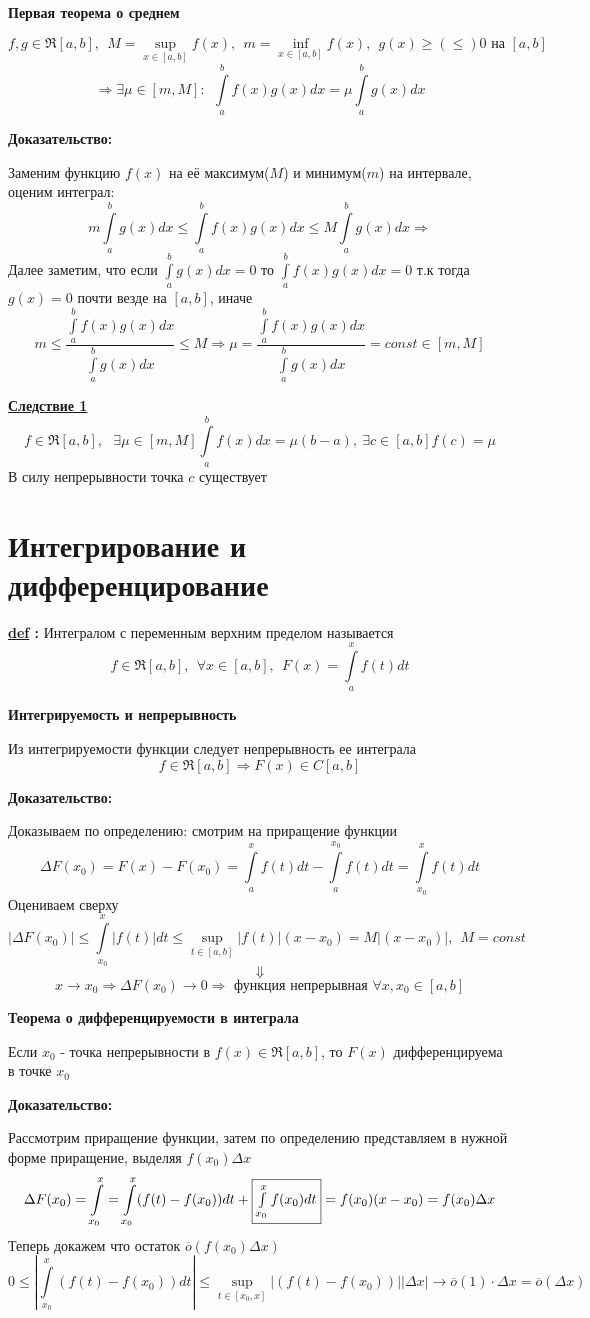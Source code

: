 \documentclass[a4paper,11pt]{article}
\newcommand{\Def}[1]{ 
\noindent\makebox[\linewidth]{\rule{\textwidth}{1pt}} 

 \noindent \textbf{\underline{def} :}
#1 

\noindent\makebox[\linewidth]{\rule{\textwidth}{1pt}} }
\newcommand{\Theorem}[3]{ 
\noindent\makebox[\linewidth]{\rule{\textwidth}{2pt}}

\noindent \textbf{#1} 
 
 #2
 
 \noindent\makebox[\linewidth]{\rule{\textwidth}{2pt}}
 \noindent \textbf{Доказательство:}
 
 #3
 
 \noindent\makebox[\linewidth]{\rule{\textwidth}{2pt}}
 }
\newcommand{\ubf}[1]{ \noindent\textbf{\underline{#1}}}
\begin{document}
\Theorem{Первая теорема о среднем \label{Th:firstaverage}}
{
\[
f, g \in \Re[a, b], \ \  M = \sup\limits_{x \in [a, b]} f(x), \ \ m = \inf\limits_{x \in [a, b]} f(x), \ \  g(x) \geq(\leq) 0 \text{ на } [a, b]
\] 
\[
\Rightarrow \exists \mu \in [m, M]: \ \ \int\limits_a^b f(x)g(x)dx = \mu \int\limits_a^b g(x)dx
\]
}
{
Заменим функцию $f(x)$ на её максимум($M$) и минимум($m$) на интервале, оценим интеграл:
\[
m\int\limits_a^b g(x)dx \leq \int\limits_a^b f(x)g(x)dx \leq M\int\limits_a^b g(x)dx \Rightarrow
\]
Далее заметим, что если $\int\limits_a^b g(x)dx = 0$ то $\int\limits_a^b f(x)g(x)dx = 0$ т.к тогда $g(x) = 0$ почти везде на $[a,b]$, иначе 
\[
m \leq \dfrac{\int\limits_a^b f(x)g(x)dx}{\int\limits_a^b g(x)dx} \leq M \Rightarrow \mu = \dfrac{\int\limits_a^b f(x)g(x)dx}{\int\limits_a^b g(x)dx} = const \in [m, M] 
\]
}

\ubf{Следствие 1} 
\[
f \in \Re[a, b], \ \ \ \exists \mu \in [m, M]  \int\limits_a^b f(x)dx = \mu(b-a), \ \exists c\in[a, b] f(c) = \mu 
\]
В силу непрерывности точка $c$ существует

\section{Интегрирование и дифференцирование}

\Def
{ Интегралом с переменным верхним пределом называется
\[
f \in \Re[a, b], \ \ \forall x \in [a, b], \ \ F(x) = \int\limits_a^x f(t)dt
\]
}

\Theorem{Интегрируемость и непрерывность \label{Th:intcon} }
{
	Из интегрируемости функции следует непрерывность ее интеграла 
	\[
f \in \Re[a,b] \Rightarrow F(x) \in C[a,b] 
\]
}
{Доказываем по определению: смотрим на приращение функции
\[
\Delta F(x_0) = F(x) - F(x_0) = \int\limits_a^x f(t)dt - \int\limits_a^{x_0}f(t)dt = \int\limits_{x_0}^{x} f(t)dt 
\]
Оцениваем сверху
\[
|\Delta F(x_0)| \leq \int\limits_{x_0}^x |f(t)|dt \leq \sup\limits_{t\in [a, b]} |f(t)| (x - x_0) = M |(x - x_0)|, \ \ M = const 
\]
\[
\Downarrow
\]
\[
x \to x_0 \Rightarrow \Delta F(x_0) \to 0 \Rightarrow \text{\ \ \ функция непрерывная \ \ } \forall x, x_0 \in [a, b]
 \]
}

 \Theorem{ \label{Th:intdif}
Теорема о дифференцируемости в интеграла
}
{
 Если $x_0$  - точка непрерывности в $f(x) \in \Re[a, b]$, то $F(x)$ дифференцируема в точке $x_0$
}
{Рассмотрим приращение функции, затем по определению представляем в нужной форме приращение, выделяя $f(x_0)\Delta x$
\[
\Delta F(x_0) = \int\limits_{x_0}^x = \int\limits_{x_0}^x(f(t) - f(x_0))dt + \fbox{$ \int\limits_{x_0}^x f(x_0)dt$} =   f(x_0)(x - x_0) = f(x_0) \Delta x
\]
Теперь докажем что остаток $\overline{o} (f(x_0)\Delta x)$
\[
0 \leq \left| \int\limits_{x_0}^x (f(t) - f(x_0))dt \right| \leq \sup\limits_{t \in [x_0, x]} |(f(t) - f(x_0))| |\Delta x| \to \overline{o}(1) \cdot \Delta x = \overline{o}(\Delta x)
\]
}
\end{document}
